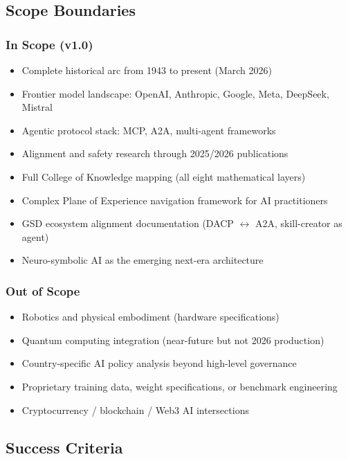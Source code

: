 \documentclass[11pt,letterpaper]{article}
\begin{document}
\subsection{Scope Boundaries}

\subsubsection{In Scope (v1.0)}
\begin{itemize}[leftmargin=*]
\item Complete historical arc from 1943 to present (March 2026)
\item Frontier model landscape: OpenAI, Anthropic, Google, Meta, DeepSeek, Mistral
\item Agentic protocol stack: MCP, A2A, multi-agent frameworks
\item Alignment and safety research through 2025/2026 publications
\item Full College of Knowledge mapping (all eight mathematical layers)
\item Complex Plane of Experience navigation framework for AI practitioners
\item GSD ecosystem alignment documentation (DACP $\leftrightarrow$ A2A, skill-creator as agent)
\item Neuro-symbolic AI as the emerging next-era architecture
\end{itemize}

\subsubsection{Out of Scope}
\begin{itemize}[leftmargin=*]
\item Robotics and physical embodiment (hardware specifications)
\item Quantum computing integration (near-future but not 2026 production)
\item Country-specific AI policy analysis beyond high-level governance
\item Proprietary training data, weight specifications, or benchmark engineering
\item Cryptocurrency / blockchain / Web3 AI intersections
\end{itemize}

\subsection{Success Criteria}
\end{document}
